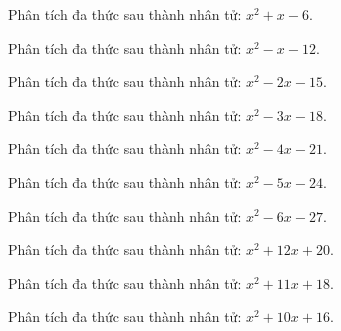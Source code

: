 \begin{bt}
	Phân tích đa thức sau thành nhân tử: $x^2 + x - 6$.
\end{bt}
\begin{bt}
	Phân tích đa thức sau thành nhân tử: $x^2 - x - 12$.
\end{bt}
\begin{bt}
	Phân tích đa thức sau thành nhân tử: $x^2 - 2 x - 15$.
\end{bt}
\begin{bt}
	Phân tích đa thức sau thành nhân tử: $x^2 - 3 x - 18$.
\end{bt}
\begin{bt}
	Phân tích đa thức sau thành nhân tử: $x^2 - 4 x - 21$.
\end{bt}
\begin{bt}
	Phân tích đa thức sau thành nhân tử: $x^2 - 5 x - 24$.
\end{bt}
\begin{bt}
	Phân tích đa thức sau thành nhân tử: $x^2 - 6 x - 27$.
\end{bt}
\begin{bt}
	Phân tích đa thức sau thành nhân tử: $x^2 + 12 x + 20$.
\end{bt}
\begin{bt}
	Phân tích đa thức sau thành nhân tử: $x^2 + 11 x + 18$.
\end{bt}
\begin{bt}
	Phân tích đa thức sau thành nhân tử: $x^2 + 10 x + 16$.
\end{bt}

